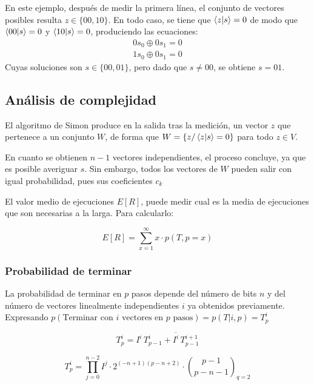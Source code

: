En este ejemplo, después de medir la primera línea, el conjunto de vectores 
posibles resulta $z \in \{00, 10\}$. En todo caso, se tiene que $\braket{z|s} = 
0$ de modo que $\braket{00|s} = 0$ y $\braket{10|s} = 0$, produciendo las 
ecuaciones:
%
\begin{equation}
\begin{split}
	0 s_0 \oplus 0 s_1 = 0 \\
	1 s_0 \oplus 0 s_1 = 0
\end{split}
\end{equation}
%
Cuyas soluciones son $s \in \{00, 01\}$, pero dado que $s \neq 00$, se obtiene 
$s = 01$.

\subsection{Análisis de complejidad}

El algoritmo de Simon produce en la salida tras la medición, un vector $z$ que 
pertenece a un conjunto $W$, de forma que $W = \{z / \braket{z|s} = 0\}$ para 
todo $z \in V$.

En cuanto se obtienen $n-1$ vectores independientes, el proceso concluye, ya que 
es posible averiguar $s$. Sin embargo, todos los vectores de $W$ pueden salir 
con igual probabilidad, pues sus coeficientes $c_k$

El valor medio de ejecuciones $E[R]$, puede medir cual es la media de 
ejecuciones que son necesarias a la larga. Para calcularlo:

$$ E[R] = \sum^{\infty}_{x=1} x \cdot p(T, p=x) $$

\subsubsection{Probabilidad de terminar}

La probabilidad de terminar en $p$ pasos depende del número de bits $n$ y del 
número de vectores linealmente independientes $i$ ya obtenidos previamente.  
Expresando $p(\textrm{Terminar con $i$ vectores en $p$ pasos}) = p(T|i,p) = 
T^i_p$ 

$$T^i_p = I^i \, T^i_{p-1} + \overline{I^i} \, T^{i+1}_{p-1}$$

$$ T^i_p = \prod^{n-2}_{j=0} I^j \cdot 2^{(-n+1)(p-n+2)} \cdot {p-1 \choose 
p-n-1}_{q=2} $$



